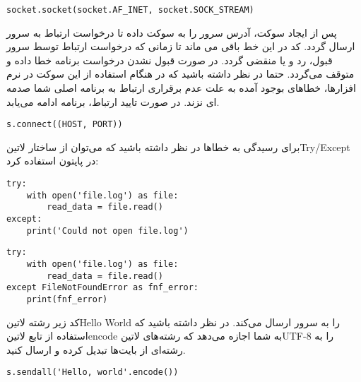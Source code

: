 \documentclass[]{article}
\begin{document}
  \begin{latin}
  \begin{verbatim}
socket.socket(socket.AF_INET, socket.SOCK_STREAM)
  \end{verbatim}
  \end{latin}

  پس از ایجاد سوکت، آدرس سرور را به سوکت داده تا درخواست ارتباط به سرور ارسال گردد.
  کد در این خط باقی می ماند تا زمانی که درخواست ارتباط توسط سرور قبول، رد و یا منقضی گردد.
  در صورت قبول نشدن درخواست برنامه خطا داده و متوقف می‌گردد.
  حتما در نظر داشته باشید که در هنگام استفاده از این سوکت در نرم افزارها، خطاهای بوجود آمده به علت عدم برقراری ارتباط به برنامه اصلی شما صدمه ای نزند.
  در صورت تایید ارتباط، برنامه ادامه می‌یابد.

  \begin{latin}
  \begin{verbatim}
s.connect((HOST, PORT))
  \end{verbatim}
  \end{latin}

برای رسیدگی به خطاها در نظر داشته باشید که می‌توان از ساختار ‌لاتین{Try/Except} در پایتون استفاده کرد:

  \begin{latin}
  \begin{verbatim}
try:
    with open('file.log') as file:
        read_data = file.read()
except:
    print('Could not open file.log')
  \end{verbatim}
  \end{latin}

  \begin{latin}
  \begin{verbatim}
try:
    with open('file.log') as file:
        read_data = file.read()
except FileNotFoundError as fnf_error:
    print(fnf_error)
  \end{verbatim}
  \end{latin}

  کد زیر رشته ‌لاتین{Hello World} را به سرور ارسال می‌کند. در نظر داشته باشید که استفاده از تابع ‌لاتین{encode}
  به شما اجازه می‌دهد که رشته‌های ‌لاتین{UTF-8} را به رشته‌ای از بایت‌ها تبدیل کرده و ارسال کنید.

  \begin{latin}
  \begin{verbatim}
s.sendall('Hello, world'.encode())
  \end{verbatim}
  \end{latin}
\end{document}
